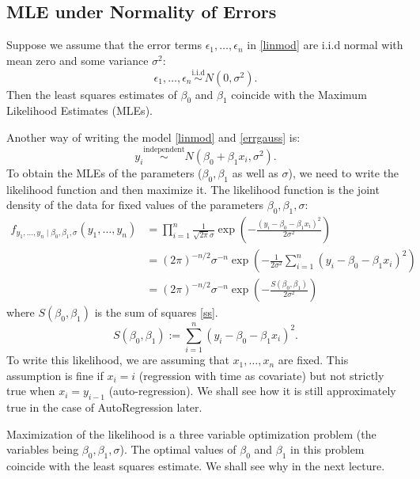 \documentclass{scrartcl}
\begin{document}
\subsection{MLE under Normality of Errors}
Suppose we assume that the error terms $\epsilon_1, \dots, \epsilon_n$ in
\eqref{linmod} are i.i.d normal with mean zero and some variance
$\sigma^2$:
\begin{equation}\label{errgauss}
 \epsilon_1, \dots, \epsilon_n \overset{\text{i.i.d}}{\sim} N(0,
 \sigma^2). 
\end{equation}
Then the least squares estimates of $\beta_0$ and $\beta_1$ coincide
with the Maximum Likelihood Estimates (MLEs). 

Another way of writing the model \eqref{linmod} and \eqref{errgauss}
is: 
\begin{equation*}
  y_i \overset{\text{independent}}{\sim} N(\beta_0 + \beta_1 x_i, 
  \sigma^2). 
\end{equation*}
To obtain the MLEs of the parameters ($\beta_0, \beta_1$ as well as
$\sigma$), we need to write the likelihood function and then maximize
it. The likelihood function is the joint density of the data for fixed
values of the parameters $\beta_0, \beta_1, \sigma$: 
\begin{align}
  f_{y_1, \dots, y_n \mid \beta_0, \beta_1, \sigma}(y_1, \dots, y_n) &=
  \prod_{i=1}^n \frac{1}{\sqrt{2 \pi} \sigma} \exp \left(-\frac{(y_i -
                                                                       \beta_0
                                                                       -
                                                                       \beta_1
                                                                       x_i)^2}{2
                                                                       \sigma^2}
                                                                       \right)
  \nonumber \\
  &= (2 \pi)^{-n/2} \sigma^{-n} \exp \left(-\frac{1}{2 \sigma^2}
    \sum_{i=1}^n (y_i - \beta_0 - \beta_1 x_i)^2 \right) \nonumber \\
  &= (2 \pi)^{-n/2} \sigma^{-n} \exp \left(-\frac{S(\beta_0,
    \beta_1)}{2 \sigma^2} \right) \label{like}
\end{align}
where $S(\beta_0, \beta_1)$ is the sum of squares \eqref{ss}. 
\begin{equation*}
  S(\beta_0, \beta_1) :=
    \sum_{i=1}^n (y_i - \beta_0 - \beta_1 x_i)^2. 
  \end{equation*}
To write this likelihood, we are assuming that $x_1, \dots, x_n$ are
fixed. This assumption is fine if $x_i = i$ (regression with time as
covariate) but not strictly true when $x_i = y_{i-1}$
(auto-regression). We shall see how it is still approximately true in
the case of AutoRegression later.

Maximization of the likelihood is a three variable optimization
problem (the variables being $\beta_0, \beta_1, \sigma$). The optimal
values of $\beta_0$ and $\beta_1$ in this problem coincide with the
least squares estimate. We shall see why in the next lecture. 
\end{document}

